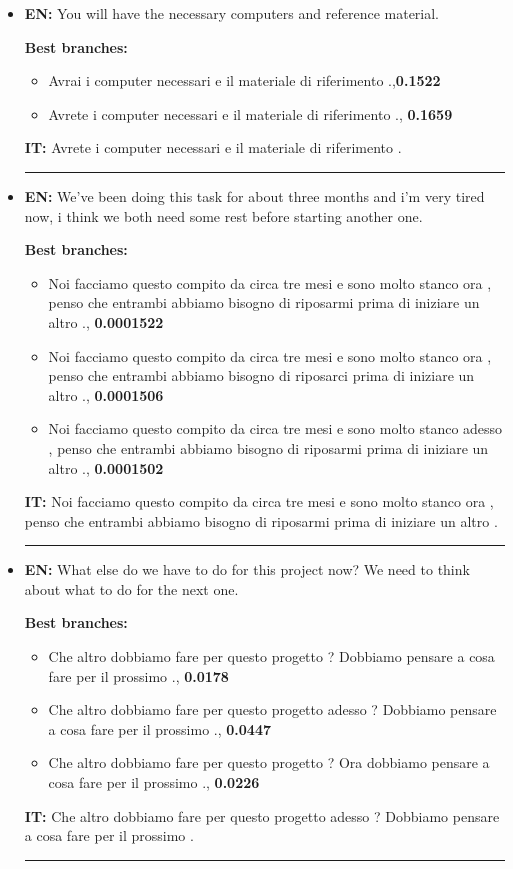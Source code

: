 \begin{itemize}
    \item \textbf{EN:} You will have the necessary computers and reference material.
    
    \textbf{Best branches:}
    \begin{itemize}
        \item Avrai i computer necessari e il materiale di riferimento .,\textbf{0.1522}
        \item Avrete i computer necessari e il materiale di riferimento ., \textbf{0.1659}
    \end{itemize}
    \textbf{IT:} Avrete i computer necessari e il materiale di riferimento .\\
    \noindent\rule{14.8cm}{0.4pt}

    \item \textbf{EN:} We've been doing this task for about three months and i'm very tired now, i think we both need some rest before starting another one.
    
    \textbf{Best branches:}
    \begin{itemize}
        \item Noi facciamo questo compito da circa tre mesi e sono molto stanco ora , penso che entrambi abbiamo bisogno di riposarmi prima di iniziare un altro ., \textbf{0.0001522}
        \item Noi facciamo questo compito da circa tre mesi e sono molto stanco ora , penso che entrambi abbiamo bisogno di riposarci prima di iniziare un altro ., \textbf{0.0001506}
        \item Noi facciamo questo compito da circa tre mesi e sono molto stanco adesso , penso che entrambi abbiamo bisogno di riposarmi prima di iniziare un altro ., \textbf{0.0001502}
    \end{itemize}
    \textbf{IT:} Noi facciamo questo compito da circa tre mesi e sono molto stanco ora , penso che entrambi abbiamo bisogno di riposarmi prima di iniziare un altro .\\
    \noindent\rule{14.8cm}{0.4pt}

    \item \textbf{EN:} What else do we have to do for this project now? We need to think about what to do for the next one.
    
    \textbf{Best branches:}
    \begin{itemize}
        \item Che altro dobbiamo fare per questo progetto ? Dobbiamo pensare a cosa fare per il prossimo ., \textbf{0.0178}
        \item Che altro dobbiamo fare per questo progetto adesso ? Dobbiamo pensare a cosa fare per il prossimo ., \textbf{0.0447}
        \item Che altro dobbiamo fare per questo progetto ? Ora dobbiamo pensare a cosa fare per il prossimo ., \textbf{0.0226}
    \end{itemize}
    \textbf{IT:} Che altro dobbiamo fare per questo progetto adesso ? Dobbiamo pensare a cosa fare per il prossimo .\\
    \noindent\rule{14.8cm}{0.4pt}


\end{itemize}
